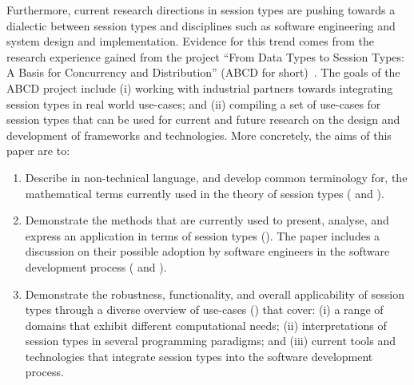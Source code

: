 Furthermore, current research directions in session types are
pushing towards a dialectic between session types and disciplines
such as software engineering and system design and implementation.
Evidence for this trend comes from the research experience
gained from the project
``From Data Types to Session Types: A Basis for Concurrency and Distribution''
(ABCD for short)~\cite{ABCD}.
The goals of the ABCD project include (i)
working with industrial partners towards integrating
session types in real world use-cases; and (ii)
compiling a set of use-cases
for session types that can be used for current and future research on
the design and development of frameworks and technologies.
%
More concretely, the aims of this paper are to:
%
\begin{enumerate}
	\item	Describe in non-technical language, and develop common terminology
			for, the mathematical terms currently used in the theory of
			session types ( and ).

	\item	Demonstrate the methods that are currently used to present,
			analyse, and express an application in terms of session types
			().
			The paper includes a discussion on their possible adoption by
			software engineers in the software development process
			( and ).


	\item	Demonstrate the robustness, functionality, and overall applicability
			of session types through a diverse overview of use-cases ()
			that cover:
			(i) a range of domains that exhibit different computational needs;
			(ii) interpretations of session types in several
			programming paradigms; and
			(iii) current tools and technologies that integrate session types
			into the software development process.
%
%
%
%


\end{enumerate}
